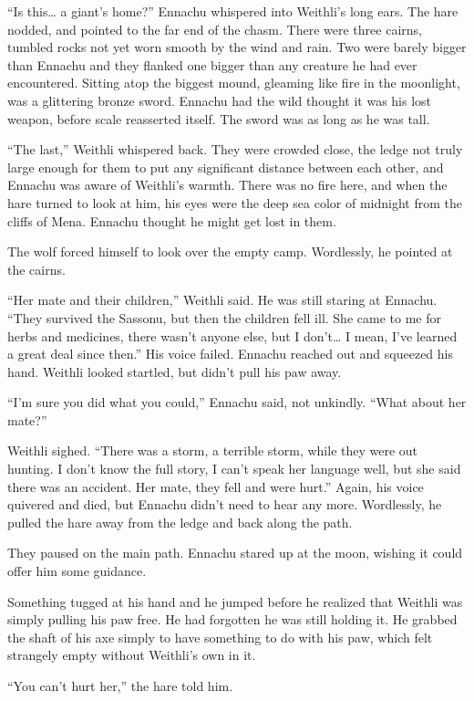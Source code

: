``Is this\ldots{} a giant's home?'' Ennachu whispered into Weithli's long ears. The hare nodded, and pointed to the far end of the chasm. There were three cairns, tumbled rocks not yet worn smooth by the wind and rain. Two were barely bigger than Ennachu and they flanked one bigger than any creature he had ever encountered. Sitting atop the biggest mound, gleaming like fire in the moonlight, was a glittering bronze sword. Ennachu had the wild thought it was his lost weapon, before scale reasserted itself. The sword was as long as he was tall.

``The last,'' Weithli whispered back. They were crowded close, the ledge not truly large enough for them to put any significant distance between each other, and Ennachu was aware of Weithli's warmth. There was no fire here, and when the hare turned to look at him, his eyes were the deep sea color of midnight from the cliffs of Mena. Ennachu thought he might get lost in them.

The wolf forced himself to look over the empty camp. Wordlessly, he pointed at the cairns.

``Her mate and their children,'' Weithli said. He was still staring at Ennachu. ``They survived the Sassonu, but then the children fell ill. She came to me for herbs and medicines, there wasn't anyone else, but I don't\ldots{} I mean, I've learned a great deal since then.'' His voice failed. Ennachu reached out and squeezed his hand. Weithli looked startled, but didn't pull his paw away.

``I'm sure you did what you could,'' Ennachu said, not unkindly. ``What about her mate?''

Weithli sighed. ``There was a storm, a terrible storm, while they were out hunting. I don't know the full story, I can't speak her language well, but she said there was an accident. Her mate, they fell and were hurt.'' Again, his voice quivered and died, but Ennachu didn't need to hear any more. Wordlessly, he pulled the hare away from the ledge and back along the path.

They paused on the main path. Ennachu stared up at the moon, wishing it could offer him some guidance.

Something tugged at his hand and he jumped before he realized that Weithli was simply pulling his paw free. He had forgotten he was still holding it. He grabbed the shaft of his axe simply to have something to do with his paw, which felt strangely empty without Weithli's own in it.

``You can't hurt her,'' the hare told him.

